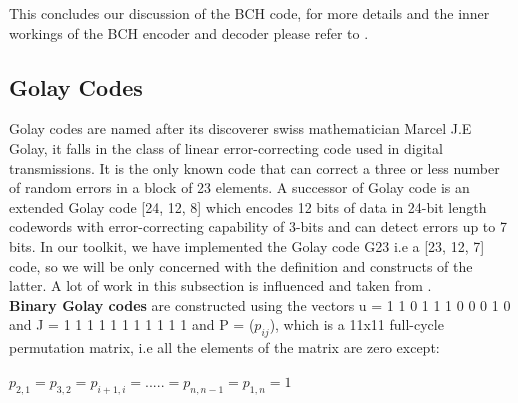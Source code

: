 This concludes our discussion of the BCH code, for more details and the inner workings of the BCH encoder and decoder please refer to \cite{66}.

\subsection{Golay Codes}
\label{golay_related}
Golay codes are named after its discoverer swiss mathematician Marcel J.E Golay, it falls in the class of linear error-correcting code used in digital transmissions. It is the only known code that can correct a three or less number of random errors in a block of 23 elements. A successor of Golay code is an extended Golay code [24, 12, 8] which encodes 12 bits of data in 24-bit length codewords with error-correcting capability of 3-bits and can detect errors up to 7 bits. In our toolkit, we have implemented
the Golay code G23 i.e a [23, 12, 7] code, so we will be only concerned with the definition and constructs of the latter. A lot of work in this subsection is influenced and taken from \cite{golay}.\\

\textbf{Binary Golay codes} are constructed using the vectors u = 1 1 0 1 1 1 0 0 0 1 0 and J = 1 1 1 1 1 1 1 1 1 1 1 and P = ($p_{ij}$), which is a 11x11 full-cycle permutation matrix, i.e all the elements of the matrix are zero except:

\tab \tab \tab $p_{2,1} = p_{3,2} = p_{i+1,i} = . . . . . = p_{n,n-1} = p_{1,n} = 1$

